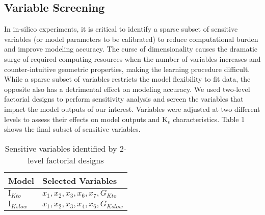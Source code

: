 \documentclass[journal]{IEEEtran}
\begin{document}
\subsection{Variable Screening}
In in-silico experiments, it is critical to identify a sparse subset of sensitive variables (or model parameters to be calibrated) to reduce computational burden and improve modeling accuracy. The curse of dimensionality causes the dramatic surge of required computing resources when the number of variables increases and counter-intuitive geometric properties, making the learning procedure difficult. While a sparse subset of variables restricts the model flexibility to fit data, the opposite also has a detrimental effect on modeling accuracy. We used two-level factorial designs to perform sensitivity analysis and screen the variables that impact the model outputs of our interest. Variables were adjusted at two different levels to assess their effects on model outputs and $\text{K}_{v}$ characteristics. Table 1 shows the final subset of sensitive variables.

\begin{table}
    \caption{Sensitive variables identified by 2-level factorial designs}
    \label{table1}
    \centering
    \begin{tabular}{ll}
        \toprule
        Model & Selected Variables  \\ 
        \hline
        $\text{I}_{Kto}$ & $x_1, x_2, x_3, x_6, x_7, G_{Kto}$ \\
        $\text{I}_{Kslow}$ & $x_1, x_2, x_3, x_4, x_6, G_{Kslow}$ \\
        \bottomrule
    \end{tabular}
\end{table}
\end{document}
